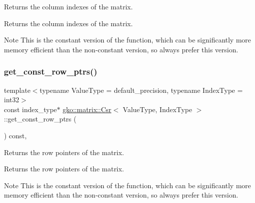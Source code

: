 Returns the column indexes of the matrix. 

\begin{DoxyReturn}{Returns}
the column indexes of the matrix.
\end{DoxyReturn}
\begin{DoxyNote}{Note}
This is the constant version of the function, which can be significantly more memory efficient than the non-\/constant version, so always prefer this version. 
\end{DoxyNote}
\mbox{\label{classgko_1_1matrix_1_1Csr_a50c9ce521649450d7ae5ff488e42c190}} 
\subsubsection{\texorpdfstring{get\+\_\+const\+\_\+row\+\_\+ptrs()}{get\_const\_row\_ptrs()}}
{\footnotesize\ttfamily template$<$typename Value\+Type = default\+\_\+precision, typename Index\+Type = int32$>$ \\
const index\+\_\+type$\ast$ \hyperlink{classgko_1_1matrix_1_1Csr}{gko\+::matrix\+::\+Csr}$<$ Value\+Type, Index\+Type $>$\+::get\+\_\+const\+\_\+row\+\_\+ptrs (\begin{DoxyParamCaption}{ }\end{DoxyParamCaption}) const\hspace{0.3cm}{\ttfamily [inline]}, {\ttfamily [noexcept]}}



Returns the row pointers of the matrix. 

\begin{DoxyReturn}{Returns}
the row pointers of the matrix.
\end{DoxyReturn}
\begin{DoxyNote}{Note}
This is the constant version of the function, which can be significantly more memory efficient than the non-\/constant version, so always prefer this version. 
\end{DoxyNote}
\mbox{\label{classgko_1_1matrix_1_1Csr_ac046f27c47848bf31c9234567661ef48}} 
